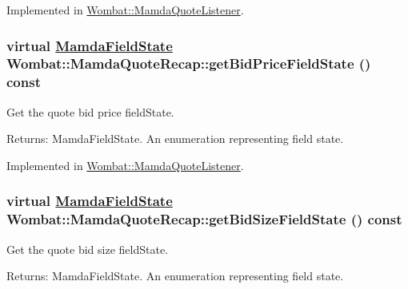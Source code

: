 Implemented in \hyperlink{classWombat_1_1MamdaQuoteListener_2638f27bca3f6fa7c673e5b6924e3842}{Wombat::Mamda\-Quote\-Listener}.\hypertarget{classWombat_1_1MamdaQuoteRecap_a28f3c6d308c9122dd28747c57f89bc8}{
\subsubsection[getBidPriceFieldState]{\setlength{\rightskip}{0pt plus 5cm}virtual \hyperlink{namespaceWombat_93aac974f2ab713554fd12a1fa3b7d2a}{Mamda\-Field\-State} Wombat::Mamda\-Quote\-Recap::get\-Bid\-Price\-Field\-State () const}}
\label{classWombat_1_1MamdaQuoteRecap_a28f3c6d308c9122dd28747c57f89bc8}


Get the quote bid price field\-State. 

\begin{Desc}
\item[Returns:]Mamda\-Field\-State. An enumeration representing field state. \end{Desc}


Implemented in \hyperlink{classWombat_1_1MamdaQuoteListener_edb910c741c98a43134d0abcb325079e}{Wombat::Mamda\-Quote\-Listener}.\hypertarget{classWombat_1_1MamdaQuoteRecap_4b6987d65c59397934287fa535968056}{
\subsubsection[getBidSizeFieldState]{\setlength{\rightskip}{0pt plus 5cm}virtual \hyperlink{namespaceWombat_93aac974f2ab713554fd12a1fa3b7d2a}{Mamda\-Field\-State} Wombat::Mamda\-Quote\-Recap::get\-Bid\-Size\-Field\-State () const}}
\label{classWombat_1_1MamdaQuoteRecap_4b6987d65c59397934287fa535968056}


Get the quote bid size field\-State. 

\begin{Desc}
\item[Returns:]Mamda\-Field\-State. An enumeration representing field state. \end{Desc}


